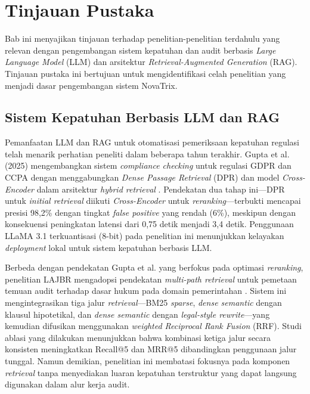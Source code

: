 \documentclass[bachelor,bahasa]{thesisdtetiugm}
\begin{document}
\section{Tinjauan Pustaka}
\label{sec:tinjauan-pustaka}

Bab ini menyajikan tinjauan terhadap penelitian-penelitian terdahulu yang relevan dengan pengembangan sistem kepatuhan dan audit berbasis \textit{Large Language Model} (LLM) dan arsitektur \textit{Retrieval-Augmented Generation} (RAG). Tinjauan pustaka ini bertujuan untuk mengidentifikasi celah penelitian yang menjadi dasar pengembangan sistem NovaTrix.

\subsection{Sistem Kepatuhan Berbasis LLM dan RAG}

Pemanfaatan LLM dan RAG untuk otomatisasi pemeriksaan kepatuhan regulasi telah menarik perhatian peneliti dalam beberapa tahun terakhir. Gupta et al. (2025) mengembangkan sistem \textit{compliance checking} untuk regulasi GDPR dan CCPA dengan menggabungkan \textit{Dense Passage Retrieval} (DPR) dan model \textit{Cross-Encoder} dalam arsitektur \textit{hybrid retrieval} \cite{gupta2025compliance}. Pendekatan dua tahap ini---DPR untuk \textit{initial retrieval} diikuti \textit{Cross-Encoder} untuk \textit{reranking}---terbukti mencapai presisi 98,2\% dengan tingkat \textit{false positive} yang rendah (6\%), meskipun dengan konsekuensi peningkatan latensi dari 0,75 detik menjadi 3,4 detik. Penggunaan LLaMA 3.1 terkuantisasi (8-bit) pada penelitian ini menunjukkan kelayakan \textit{deployment} lokal untuk sistem kepatuhan berbasis LLM.

Berbeda dengan pendekatan Gupta et al. yang berfokus pada optimasi \textit{reranking}, penelitian LAJBR mengadopsi pendekatan \textit{multi-path retrieval} untuk pemetaan temuan audit terhadap dasar hukum pada domain pemerintahan \cite{lajbr2025}. Sistem ini mengintegrasikan tiga jalur \textit{retrieval}---BM25 \textit{sparse}, \textit{dense semantic} dengan klausul hipotetikal, dan \textit{dense semantic} dengan \textit{legal-style rewrite}---yang kemudian difusikan menggunakan \textit{weighted Reciprocal Rank Fusion} (RRF). Studi ablasi yang dilakukan menunjukkan bahwa kombinasi ketiga jalur secara konsisten meningkatkan Recall@5 dan MRR@5 dibandingkan penggunaan jalur tunggal. Namun demikian, penelitian ini membatasi fokusnya pada komponen \textit{retrieval} tanpa menyediakan luaran kepatuhan terstruktur yang dapat langsung digunakan dalam alur kerja audit.
\end{document}

